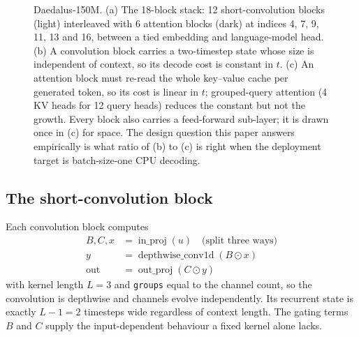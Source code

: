 \documentclass[conference]{IEEEtran}
\begin{document}
\begin{figure}[t]
\caption{Daedalus-150M. (a) The 18-block stack: 12 short-convolution blocks
(light) interleaved with 6 attention blocks (dark) at indices 4, 7, 9, 11, 13
and 16, between a tied embedding and language-model head. (b) A convolution
block carries a two-timestep state whose size is independent of context, so its
decode cost is constant in $t$. (c) An attention block must re-read the whole
key--value cache per generated token, so its cost is linear in $t$; grouped-query
attention (4 KV heads for 12 query heads) reduces the constant but not the
growth. Every block also carries a feed-forward sub-layer; it is drawn once in
(c) for space. The design question this paper answers empirically is what ratio
of (b) to (c) is right when the deployment target is batch-size-one CPU
decoding.}
\label{fig:arch}
\end{figure}

\subsection{The short-convolution block}

Each convolution block computes
\begin{align}
B, C, x &= \operatorname{in\_proj}(u) \quad \text{(split three ways)} \\
y &= \operatorname{depthwise\_conv1d}(B \odot x) \\
\text{out} &= \operatorname{out\_proj}(C \odot y)
\end{align}
with kernel length $L=3$ and \texttt{groups} equal to the channel count, so the
convolution is depthwise and channels evolve independently. Its recurrent state
is exactly $L-1=2$ timesteps wide regardless of context length. The gating terms
$B$ and $C$ supply the input-dependent behaviour a fixed kernel alone lacks.
\end{document}
